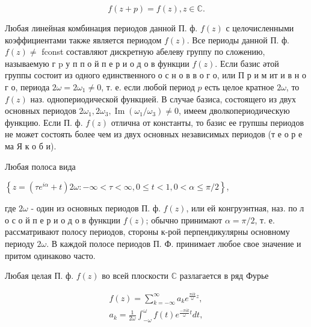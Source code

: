 \documentclass[10pt]{article}
\begin{document}
\[

f(z+p)=f(z), z \in \mathbb{C} .

\]



Любая линейная комбинация периодов данной П. ф. $f(z)$ с целочисленными коэффициентами также является периодом $f(z)$. Все периоды данной П. ф. $f(z) \neq$ fconst составляют дискретную абелеву группу по сложению, называемую г p у п п о й п е р и о д о в функции $f(z)$. Если базис әтой группы состоит из одного единственного о с н о в в о г о, или П р и м ит и в н о г о, периода $2 \omega=2 \omega_{1} \neq 0$, т. е. если любой период $p$ есть целое кратное $2 \omega$, то $f(z)$ наз. однопериодической функцией. В случае базиса, состоящего из двух основных периодов $2 \omega_{1}, 2 \omega_{3}, \operatorname{Im}\left(\omega_{1} / \omega_{3}\right) \neq 0$, имеем дволкопериодическую функцию. Если П. ф. $f(z)$ отлична от константы, то базис ее групшы периодов не может состоять более чем из двух основных независимых периодов (т е о р е ма Я к о б и).



Любая полоса вида



$\left\{z=\left(\tau e^{i \alpha}+t\right) 2 \omega:-\infty<\tau<\infty, 0 \leqslant t<1,0<\alpha \leqslant \pi / 2\right\}$,



где $2 \omega$ - один из основных периодов П. ф. $f(z)$, или ей конгруэнтная, наз. по л о с о й п е р и о д о в функции $f(z)$; обычно принимают $\alpha=\pi / 2$, т. е. рассматривают полосу периодов, стороны к-рой перпендикулярны основному периоду $2 \omega$. В каждой полосе периодов П. Ф. принимает любое свое значение и притом одинаково часто.



Любая целая П. ф. $f(z)$ во всей плоскости $\mathbb{C}$ разлагается в ряд Фурье



\[

\begin{gathered}

f(z)=\sum_{k=-\infty}^{\infty} a_{k} e^{\frac{\pi i k}{\omega} z}, \\

a_{k}=\frac{1}{2 \omega} \int_{-\omega}^{\omega} f(t) e^{\frac{-\pi i k}{\omega} t} d t,

\end{gathered}

\]
\end{document}
